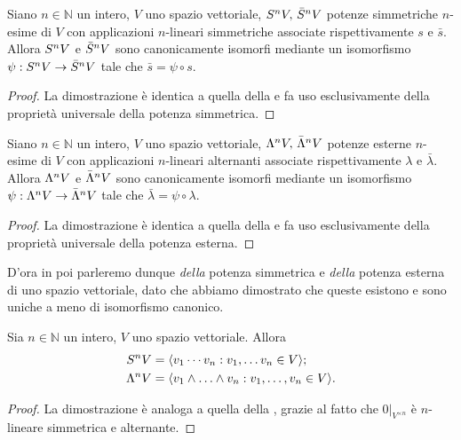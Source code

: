 \begin{proposition}
Siano $n\in\mathbb{N}$ un intero, $V$ uno spazio vettoriale, $S^nV,\,\allowbreak\bar{S}^nV$ potenze simmetriche $n$-esime di $V$ con applicazioni $n$-lineari simmetriche associate rispettivamente $s$ e $\bar{s}$.
Allora $S^nV$ e $\bar{S}^nV$ sono canonicamente isomorfi mediante un isomorfismo $\psi:S^nV\to\bar{S}^nV$ tale che $\bar{s}=\psi\circ s$.
\end{proposition}
\begin{proof}
La dimostrazione è identica a quella della  e fa uso esclusivamente della proprietà universale della potenza simmetrica.
\end{proof}

\begin{proposition}
Siano $n\in\mathbb{N}$ un intero, $V$ uno spazio vettoriale, $\Lambda^nV,\,\allowbreak\bar{\Lambda}^nV$ potenze esterne $n$-esime di $V$ con applicazioni $n$-lineari alternanti associate rispettivamente $\lambda$ e $\bar{\lambda}$.
Allora $\Lambda^nV$ e $\bar{\Lambda}^nV$ sono canonicamente isomorfi mediante un isomorfismo $\psi:\Lambda^nV\to\bar{\Lambda}^nV$ tale che $\bar{\lambda}=\psi\circ \lambda$.
\end{proposition}
\begin{proof}
La dimostrazione è identica a quella della  e fa uso esclusivamente della proprietà universale della potenza esterna.
\end{proof}

D'ora in poi parleremo dunque \emph{della} potenza simmetrica e \emph{della} potenza esterna di uno spazio vettoriale, dato che abbiamo dimostrato che queste esistono e sono uniche a meno di isomorfismo canonico.

\begin{proposition}
Sia $n\in\mathbb{N}$ un intero, $V$ uno spazio vettoriale. Allora
\begin{align*}
S^nV&=\langle v_1\cdots v_n:v_1,\ldots v_n\in V\rangle;\\
\Lambda^nV&=\langle v_1\wedge\ldots\wedge v_n:v_1,\ldots, v_n\in V\rangle.
\end{align*}
\end{proposition}
\begin{proof}
La dimostrazione è analoga a quella della , grazie al fatto che $0|_{V^{\times n}}$ è $n$-lineare simmetrica e alternante.
\end{proof}


